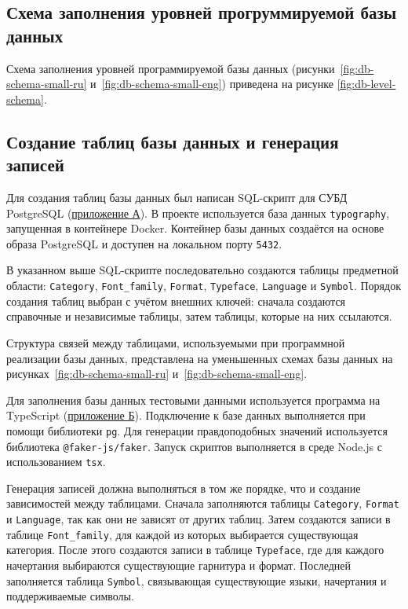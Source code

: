 
\subsection{Схема заполнения уровней прогруммируемой базы данных}

Схема заполнения уровней программируемой базы данных (рисунки~\ref{fig:db-schema-small-ru} и~\ref{fig:db-schema-small-eng}) приведена на рисунке \ref{fig:db-level-schema}.



\subsection{Создание таблиц базы данных и генерация записей}

Для создания таблиц базы данных был написан SQL-скрипт для СУБД PostgreSQL (\hyperref[app:init-sql]{приложение А}). В проекте используется база данных \texttt{typography}, запущенная в контейнере Docker. Контейнер базы данных создаётся на основе образа PostgreSQL и доступен на локальном порту \texttt{5432}.

В указанном выше SQL-скрипте последовательно создаются таблицы предметной области: \texttt{Category}, \texttt{Font_family}, \texttt{Format}, \texttt{Typeface}, \texttt{Language} и \texttt{Symbol}. Порядок создания таблиц выбран с учётом внешних ключей: сначала создаются справочные и независимые таблицы, затем таблицы, которые на них ссылаются.

Структура связей между таблицами, используемыми при программной реализации базы данных, представлена на уменьшенных схемах базы данных на рисунках~\ref{fig:db-schema-small-ru} и~\ref{fig:db-schema-small-eng}.

Для заполнения базы данных тестовыми данными используется программа на TypeScript (\hyperref[app:seed-ts]{приложение Б}). Подключение к базе данных выполняется при помощи библиотеки \texttt{pg}. Для генерации правдоподобных значений используется библиотека \texttt{@faker-js/faker}. Запуск скриптов выполняется в среде Node.js с использованием \texttt{tsx}.

Генерация записей должна выполняться в том же порядке, что и создание зависимостей между таблицами. Сначала заполняются таблицы \texttt{Category}, \texttt{Format} и \texttt{Language}, так как они не зависят от других таблиц. Затем создаются записи в таблице \texttt{Font_family}, для каждой из которых выбирается существующая категория. После этого создаются записи в таблице \texttt{Typeface}, где для каждого начертания выбираются существующие гарнитура и формат. Последней заполняется таблица \texttt{Symbol}, связывающая существующие языки, начертания и поддерживаемые символы.

